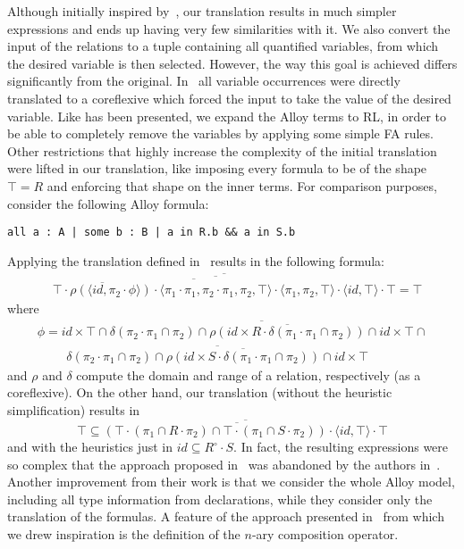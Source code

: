 \documentclass{llncs}
\begin{document}
Although initially inspired by~\cite{eqalloy}, our translation results
in much simpler expressions and ends up having very few similarities
with it. We also convert the input of the relations to a tuple
containing all quantified variables, from which the desired variable
is then selected. However, the way this goal is achieved differs
significantly from the original. In~\cite{eqalloy} all variable
occurrences were directly translated to a coreflexive which forced
the input to take the value of the desired variable. Like has been
presented, we expand the Alloy terms to RL, in order to be able to
completely remove the variables by applying some simple FA rules. Other
restrictions that highly increase the complexity of the initial
translation were lifted in our translation, like imposing every
formula to be of the shape $\top = R$ and enforcing that shape on the
inner terms. For comparison purposes, consider the following Alloy
formula:
\begin{center}
\verb+all a : A | some b : B | a in R.b && a in S.b+
\end{center}
Applying the translation defined in~\cite{eqalloy} results in the following formula:
\begin{align*}
&\overline{\overline{\overline{\overline{\top \cdot \rho (\langle id,
        \pi_2 \cdot \phi \rangle)} \cdot \langle \pi_1 \cdot \pi_1 ,
      \pi_2 \cdot \pi_1 , \pi_2 , \top \rangle \cdot \langle \pi_1 ,
      \pi_2 , \top \rangle } \cdot \langle id , \top \rangle} \cdot
  \top }  = \top 
\end{align*}
where
\begin{align*}
\phi = id \times \top \cap \overline{\delta(\pi_2 \cdot \pi_1 \cap \pi_2) \cap \overline{\rho(id \times R \cdot \delta(\pi_1 \cdot \pi_1 \cap \pi_2))} \cap id \times \top} \cap \\
\, \, \qquad \overline{\delta(\pi_2 \cdot \pi_1 \cap \pi_2) \cap
  \overline{\rho(id \times S \cdot \delta(\pi_1 \cdot \pi_1
    \cap \pi_2))} \cap id \times \top}
\end{align*}
and $\rho$ and $\delta$ compute the domain and range of a relation,
respectively (as a coreflexive).  On the other hand, our translation (without the
heuristic simplification) results in
\begin{equation*}
\top \subseteq \overline{\overline{(\top \cdot (\pi_1 \cap R \cdot \pi_2) \cap \top \cdot (\pi_1 \cap S \cdot \pi_2)) \cdot \langle id, \top \rangle} \cdot \top}
\end{equation*}
and with the heuristics just in $id \subseteq R^{\circ} \cdot S$.
In fact, the resulting expressions were so complex that the approach
proposed in~\cite{eqalloy} was abandoned by the authors
in~\cite{dynamite}. Another improvement from their work is that we
consider the whole Alloy model, including all type information from
declarations, while they consider only the translation of the
formulas. A feature of the approach presented in~\cite{friasall2} from which we
drew inspiration is the definition of the $n$-ary composition
operator.
\end{document}
